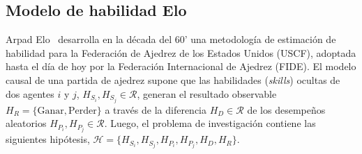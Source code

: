 \documentclass[a4paper,11pt]{book}
\theoremstyle{definition}
\begin{document}

\subsection{Modelo de habilidad Elo}

Arpad Elo~\cite{Elo2008} desarrolla en la d\'ecada del 60' una metodolog\'ia de estimaci\'on de habilidad para la Federaci\'on de Ajedrez de los Estados Unidos (USCF), adoptada hasta el d\'ia de hoy por la Federaci\'on Internacional de Ajedrez (FIDE).
%
El modelo causal de una partida de ajedrez supone que las habilidades (\emph{skills}) ocultas de dos agentes $i$ y $j$, $H_{S_i}, H_{S_j} \in \mathcal{R}$, generan el resultado observable $H_R= \{\text{Ganar}, \text{Perder} \}$ a trav\'es de la diferencia $H_D \in \mathcal{R}$ de los desempe\~nos aleatorios $H_{P_i}, H_{P_j} \in \mathcal{R}$.
%
Luego, el problema de investigaci\'on contiene las siguientes hip\'otesis, $\mathcal{H} = \{H_{S_i}, H_{S_j}, H_{P_i}, H_{P_j}, H_D, H_R \}$.
\end{document}
